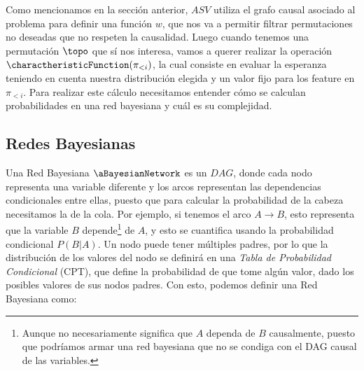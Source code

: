 Como mencionamos en la sección anterior, $ASV$ utiliza el grafo causal asociado al problema para definir una función $w$, que nos va a permitir filtrar permutaciones no deseadas que no respeten la causalidad. Luego cuando tenemos una permutación $\topo$ que sí nos interesa, vamos a querer realizar la operación $\charactheristicFunction(\pi_{<i})$, la cual consiste en evaluar la esperanza teniendo en cuenta nuestra distribución elegida y un valor fijo para los feature en $\pi_{<i}$. Para realizar este cálculo necesitamos entender cómo se calculan probabilidades en una red bayesiana y cuál es su complejidad. 

\subsection{Redes Bayesianas}
Una Red Bayesiana $\aBayesianNetwork$ es un $DAG$, donde cada nodo representa una variable diferente y los arcos representan las dependencias condicionales entre ellas, puesto que para calcular la probabilidad de la cabeza necesitamos la de la cola. Por ejemplo, si tenemos el arco $A \longrightarrow B$, esto representa que la variable $B$ depende\footnote{Aunque no necesariamente significa que $A$ dependa de $B$ causalmente, puesto que podríamos armar una red bayesiana que no se condiga con el DAG causal de las variables. } de $A$, y esto se cuantifica usando la probabilidad condicional $P(B|A)$. Un nodo puede tener múltiples padres, por lo que la distribución de los valores del nodo se definirá en una \emph{Tabla de Probabilidad Condicional} (CPT), que define la probabilidad de que tome algún valor, dado los posibles valores de sus nodos padres. Con esto, podemos definir una Red Bayesiana como:

